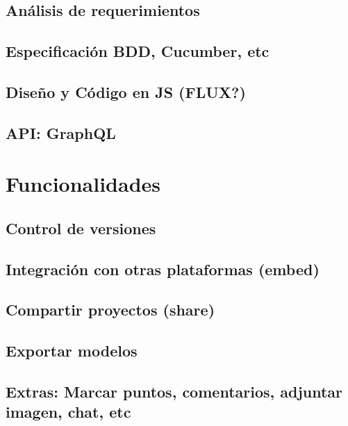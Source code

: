 \subsection{Análisis de requerimientos}

\subsection{Especificación BDD, Cucumber, etc}

\subsection{Diseño y Código en JS (FLUX?)}

\subsection{API: GraphQL}


\section{Funcionalidades}

\subsection{Control de versiones}

\subsection{Integración con otras plataformas (embed)}

\subsection{Compartir proyectos (share)}

\subsection{Exportar modelos}

\subsection{Extras: Marcar puntos, comentarios, adjuntar imagen, chat, etc}

